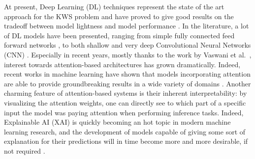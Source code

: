 At present, Deep Learning (DL) techniques represent the state of the art approach for the KWS problem and have proved to give good results on the tradeoff between model lightness and model performance \cite{dnns2014chen}\cite{convnns2015sainath}\cite{streamingkws2020Rybakov}. In the literature, a lot of DL models have been presented, ranging from simple fully connected feed forward networks \cite{dnns2014chen}, to both shallow and very deep Convolutional Neural Networks (CNN) \cite{deepreslearning2018tang}\cite{convnns2015sainath}
\cite{mittermaier2020small}\cite{choi2019temporal}. Especially in recent years, mostly thanks to the work by Vaswani et al.~\cite{attentionisall2017vaswani}, interest towards attention-based architectures has grown dramatically. Indeed, recent works in machine learning have shown that models incorporating attention are able to provide groundbreaking results in a wide variety of domains \cite{vit2020Dosovitskiy}\cite{touvron2021training}\cite{gulati2020conformer}\cite{kumar2021colorization}\cite{Devlin2019BERTPO}. Another charming feature of attention-based systems is their inherent interpretability: by visualizing the attention weights, one can directly see to which part of a specific input the model was paying attention when performing inference tasks. Indeed, Explainable AI (XAI) is quickly becoming an hot topic in modern machine learning research, and the development of models capable of giving some sort of explanation for their predictions  will in time become more and more desirable, if not required \cite{gdpr2017}.

